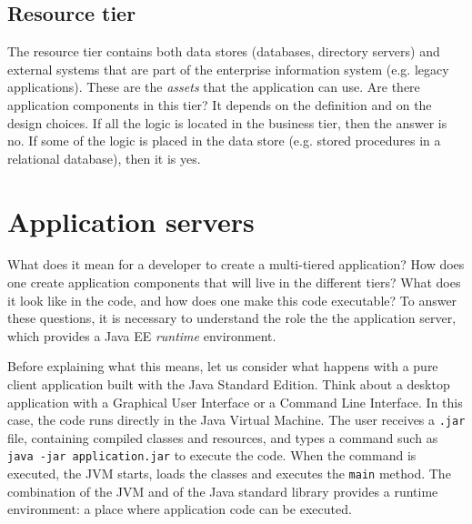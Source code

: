 \subsection{Resource tier}


The resource tier contains both data stores (databases, directory servers) and external systems that are part of the enterprise information system (e.g. legacy applications). These are the \emph{assets} that the application can use. Are there application components in this tier? It depends on the definition and on the design choices. If all the logic is located in the business tier, then the answer is no. If some of the logic is placed in the data store (e.g. stored procedures in a relational database), then it is yes.

\section{Application servers}

What does it mean for a developer to create a multi-tiered application? How does one create application components that will live in the different tiers? What does it look like in the code, and how does one make this code executable? To answer these questions, it is necessary to understand the role the the application server, which provides a Java EE \emph{runtime} environment.


Before explaining what this means, let us consider what happens with a pure client application built with the Java Standard Edition. Think about a desktop application with a Graphical User Interface or a Command Line Interface. In this case, the code runs directly in the Java Virtual Machine. The user receives a \texttt{.jar} file, containing compiled classes and resources, and types a command such as \texttt{java -jar application.jar} to execute the code. When the command is executed, the JVM starts, loads the classes and executes the \texttt{main} method. The combination of the JVM and of the Java standard library provides a runtime environment: a place where application code can be executed.

